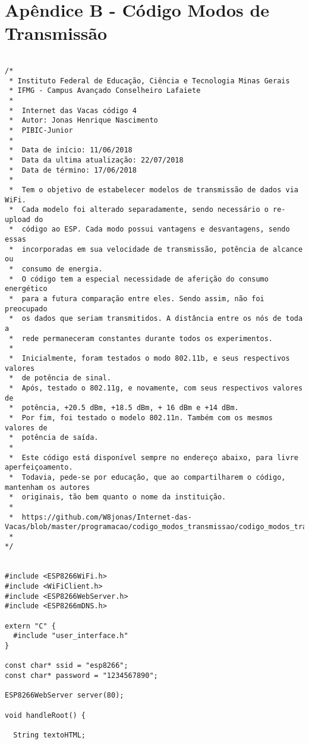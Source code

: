 \newpage
\section{Apêndice B - Código Modos de Transmissão}
\label{sc:apendice_b_}

\begin{lstlisting}

/*
 * Instituto Federal de Educação, Ciência e Tecnologia Minas Gerais
 * IFMG - Campus Avançado Conselheiro Lafaiete 
 * 
 *  Internet das Vacas código 4
 *  Autor: Jonas Henrique Nascimento
 *  PIBIC-Junior
 * 
 *  Data de início: 11/06/2018
 *  Data da ultima atualização: 22/07/2018
 *  Data de término: 17/06/2018
 *  
 *  Tem o objetivo de estabelecer modelos de transmissão de dados via WiFi.
 *  Cada modelo foi alterado separadamente, sendo necessário o re-upload do
 *  código ao ESP. Cada modo possui vantagens e desvantagens, sendo essas 
 *  incorporadas em sua velocidade de transmissão, potência de alcance ou
 *  consumo de energia.
 *  O código tem a especial necessidade de aferição do consumo energético 
 *  para a futura comparação entre eles. Sendo assim, não foi preocupado 
 *  os dados que seriam transmitidos. A distância entre os nós de toda a 
 *  rede permaneceram constantes durante todos os experimentos.
 *  
 *  Inicialmente, foram testados o modo 802.11b, e seus respectivos valores
 *  de potência de sinal.
 *  Após, testado o 802.11g, e novamente, com seus respectivos valores de 
 *  potência, +20.5 dBm, +18.5 dBm, + 16 dBm e +14 dBm.
 *  Por fim, foi testado o modelo 802.11n. Também com os mesmos valores de
 *  potência de saída.
 * 
 *  Este código está disponível sempre no endereço abaixo, para livre aperfeiçoamento. 
 *  Todavia, pede-se por educação, que ao compartilharem o código, mantenham os autores
 *  originais, tão bem quanto o nome da instituição.
 *  
 *  https://github.com/W8jonas/Internet-das-Vacas/blob/master/programacao/codigo_modos_transmissao/codigo_modos_transmissao.ino
 *  
*/


#include <ESP8266WiFi.h>
#include <WiFiClient.h>
#include <ESP8266WebServer.h>
#include <ESP8266mDNS.h>

extern "C" {
  #include "user_interface.h"
}

const char* ssid = "esp8266";
const char* password = "1234567890";

ESP8266WebServer server(80);

void handleRoot() {

  String textoHTML;


\end{lstlisting}
